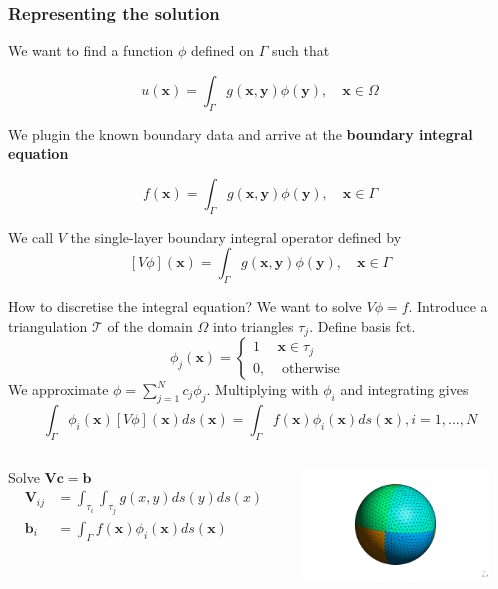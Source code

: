 \documentclass[dvipsnames,10pt]{beamer}
\def\bx{\mathbf{x}}
\def\by{\mathbf{y}}
\begin{document}
\begin{frame}
	\frametitle{Representing the solution}
	
	We want to find a function $\phi$ defined on $\Gamma$ such that
	
	\begin{tcolorbox}
	$$
	u(\bx) = \int_{\Gamma} g(\bx, \by)\phi(\by),\quad \bx\in\Omega
	$$
	\end{tcolorbox}
	
	\vspace{\baselineskip}
	
	We plugin the known boundary data and arrive at the \textbf{boundary integral equation}
	
	$$
	f(\bx) = \int_{\Gamma} g(\bx, \by)\phi(\by),\quad \bx\in\Gamma
	$$
	
	We call $V$ the single-layer boundary integral operator defined by
	$$
	[V\phi](\bx) = \int_{\Gamma} g(\bx, \by)\phi(\by),\quad \bx\in\Gamma
	$$
	
	\end{frame}
	
\begin{frame}{How to discretise the integral equation?}
We want to solve $V\phi = f$. Introduce a triangulation $\mathcal{T}$ of the domain $\Omega$ into triangles $\tau_j$. Define basis fct.
$$
\phi_j(\bx) = \left\{\begin{array}{cc} 1 & \bx \in \tau_j\\ 0, & \text{ otherwise }\end{array}\right.
$$
We approximate $\phi = \sum_{j=1}^Nc_j\phi_j$. Multiplying with $\phi_i$ and integrating gives
$$
\int_{\Gamma}\phi_i(\bx)\left[V\phi\right](\bx)ds(\bx) = \int_{\Gamma}f(\bx)\phi_i(\bx)ds(\bx), i=1, \dots, N
$$
\begin{columns}[T]
\begin{column}{0.48\textwidth}
Solve $\mathbf{V}\mathbf{c} = \mathbf{b}$
\begin{align}
\mathbf{V}_{ij} &= \int_{\tau_i}\int_{\tau_j} g(x, y)ds(y) ds(x)\nonumber\\
\mathbf{b}_i &= \int_{\Gamma}f(\bx)\phi_i(\bx)ds(\bx)\nonumber
\end{align}
\end{column}
 \begin{column}{0.48\textwidth}
\vspace{-.5cm}
 \begin{center}
\includegraphics[width=5cm]{../figs/sphere.pdf}
\end{center}
 \end{column}
 \end{columns}  
\end{frame}
\end{document}
